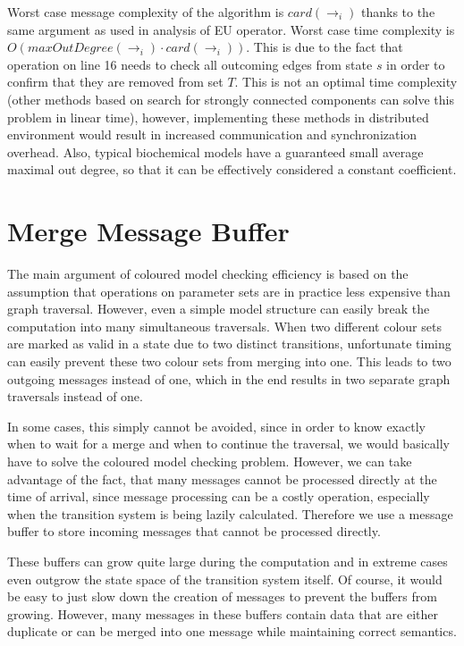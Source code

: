 \documentclass[12pt,oneside]{fithesis2}
\newcommand{\trans}[1]{\stackrel{#1}{\rightarrow}}
\begin{document}
				Worst case message complexity of the algorithm is $card(\trans{}_{i})$ thanks to the same argument as used in analysis of EU operator. Worst case time complexity is $O(maxOutDegree(\trans{}_{i}) \cdot card(\trans{}_{i}))$. This is due to the fact that operation on line 16 needs to check all outcoming edges from state $s$ in order to confirm that they are removed from set $T$. This is not an optimal time complexity (other methods based on search for strongly connected components can solve this problem in linear time), however, implementing these methods in distributed environment would result in increased communication and synchronization overhead. Also, typical biochemical models have a guaranteed small average maximal out degree, so that it can be effectively considered a constant coefficient.
								
		\section{Merge Message Buffer}
			\label{sec:merge}

			The main argument of coloured model checking efficiency is based on the assumption that operations on parameter sets are in practice less expensive than graph traversal. However, even a simple model structure can easily break the computation into many simultaneous traversals. When two different colour sets are marked as valid in a state due to two distinct transitions, unfortunate timing can easily prevent these two colour sets from merging into one. This leads to two outgoing messages instead of one, which in the end results in two separate graph traversals instead of one. 
			
			In some cases, this simply cannot be avoided, since in order to know exactly when to wait for a merge and when to continue the traversal, we would basically have to solve the coloured model checking problem. However, we can take advantage of the fact, that many messages cannot be processed directly at the time of arrival, since message processing can be a costly operation, especially when the transition system is being lazily calculated. Therefore we use a message buffer to store incoming messages that cannot be processed directly.
			
			These buffers can grow quite large during the computation and in extreme cases even outgrow the state space of the transition system itself. Of course, it would be easy to just slow down the creation of messages to prevent the buffers from growing. However, many messages in these buffers contain data that are either duplicate or can be merged into one message while maintaining correct semantics.
			
\end{document}
